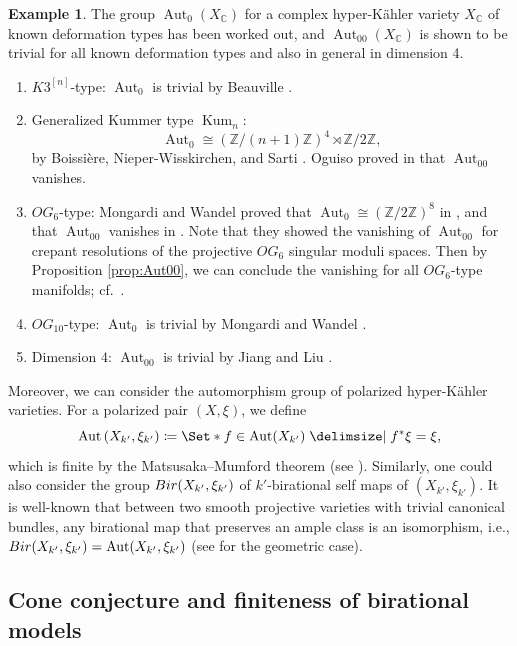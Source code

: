 \documentclass[11pt,reqno,oneside]{amsart}
\numberwithin{equation}{section}
\theoremstyle{definition}
\newtheorem{example}[theorem]{Example}
\DeclareMathOperator{\Aut}{Aut}
\newcommand{\Bir}{{\rm Bir}}
\newcommand{\CC}{\mathbb{C}}
\newcommand{\ZZ}{\mathbb{Z}}
\begin{document}
\begin{example}\label{exm:aut}
The group $\Aut_0(X_\CC)$ for a complex hyper-Kähler variety $X_\CC$ of known deformation types has been worked out, and $\Aut_{00}(X_\CC)$ is shown to be trivial for all known deformation types and also in general in dimension 4.
\begin{enumerate}
    \item $K3^{[n]}$-type: $\Aut_0$ is trivial by  Beauville \cite[Proposition 10]{Beauville-82Katata}. 
     \item Generalized Kummer type $\operatorname{Kum}_n$: $$ \Aut_0\cong (\ZZ/(n+1)\ZZ)^4\rtimes \ZZ/2\ZZ,$$  
by Boissi\`ere, Nieper-Wisskirchen, and Sarti \cite[Corollary 5]{BNS11}. Oguiso proved in \cite[Theorem 1.3]{Ogu20}
that $\Aut_{00}$ vanishes. 
\item $OG_6$-type: Mongardi and Wandel proved that $\Aut_0\cong (\ZZ/2\ZZ)^{8}$ in \cite[Theorem 5.2]{MW17}, and that $\Aut_{00}$ vanishes in \cite[Remark 6.9]{MW17}. Note that they showed the vanishing of $\Aut_{00}$ for crepant resolutions of the projective $OG_6$ singular moduli spaces. Then by Proposition \ref{prop:Aut00}, %
we can conclude the vanishing for all $OG_6$-type manifolds; cf.~\cite[Section 4]{Ogu20}.
    \item $OG_{10}$-type: $\Aut_0$ is trivial by Mongardi and Wandel \cite[Theorem 3.1]{MW17}.
 \item Dimension $4$: $\Aut_{00}$ is trivial by Jiang and Liu \cite{JiangLiu-NumericalTrivialAutomorphism}.
\end{enumerate}
\end{example}

Moreover, we can consider the automorphism group of polarized hyper-Kähler varieties. For a polarized pair $(X,\xi)$, we define  $$\Aut\left(X_{k'},\xi_{k'}\right)\coloneqq \Set*{f\in \Aut(X_{k'})\given f^\ast \xi=\xi},$$ which is finite by the Matsusaka--Mumford theorem (see \cite[\S 1, Corollary 2]{MM64}).  Similarly, one could also consider the group  $\Bir(X_{k'},\xi_{k'})$ of $k'$-birational self maps of $(X_{k'},\xi_{k'})$. It is well-known that between two smooth projective varieties with trivial canonical bundles, any birational map that preserves an ample class is an isomorphism, i.e., $\Bir(X_{k'},\xi_{k'})=\Aut(X_{k'},\xi_{k'})$ (see \cite[Corollary 3.3, Lemma 3.4]{Fuj81} for the geometric case).



\subsection{Cone conjecture and finiteness of birational models}
\label{sec:WallDivisors}
\end{document}
